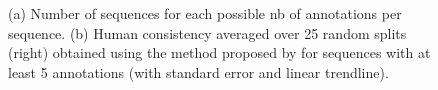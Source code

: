 \documentclass[sigconf]{acmart}
\begin{document}
\begin{figure}[!htbp]
	\centering
	\quad
	\quad
	\caption{\label{fig:human_consistency}(a) Number of sequences for each possible nb of annotations per sequence. (b) Human consistency averaged over 25 random splits (right) obtained using the method proposed by \cite{isola_2014_makes} for sequences with at least 5 annotations (with standard error and linear trendline).}
\end{figure}
\end{document}
